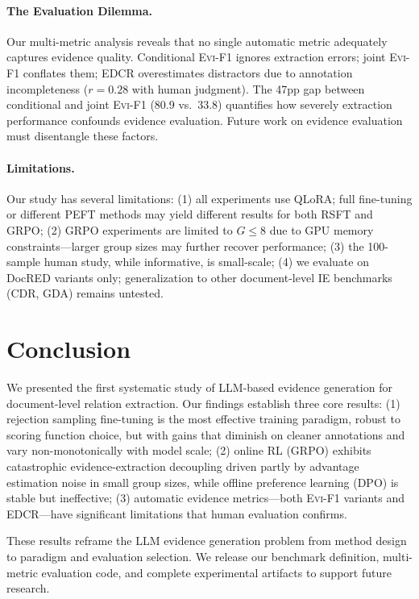 \documentclass[11pt,a4paper]{article}
\newcommand{\evi}{\textsc{Evi-F1}}
\newcommand{\edcr}{\textsc{EDCR}}
\begin{document}
\paragraph{The Evaluation Dilemma.}
Our multi-metric analysis reveals that no single automatic metric adequately captures evidence quality. Conditional \evi{} ignores extraction errors; joint \evi{} conflates them; \edcr{} overestimates distractors due to annotation incompleteness ($r{=}0.28$ with human judgment). The 47pp gap between conditional and joint \evi{} (80.9 vs.\ 33.8) quantifies how severely extraction performance confounds evidence evaluation. Future work on evidence evaluation must disentangle these factors.

\paragraph{Limitations.}
Our study has several limitations: (1) all experiments use QLoRA; full fine-tuning or different PEFT methods may yield different results for both RSFT and GRPO; (2) GRPO experiments are limited to $G \leq 8$ due to GPU memory constraints---larger group sizes may further recover performance; (3) the 100-sample human study, while informative, is small-scale; (4) we evaluate on DocRED variants only; generalization to other document-level IE benchmarks (CDR, GDA) remains untested.

\section{Conclusion}

We presented the first systematic study of LLM-based evidence generation for document-level relation extraction. Our findings establish three core results: (1) rejection sampling fine-tuning is the most effective training paradigm, robust to scoring function choice, but with gains that diminish on cleaner annotations and vary non-monotonically with model scale; (2) online RL (GRPO) exhibits catastrophic evidence-extraction decoupling driven partly by advantage estimation noise in small group sizes, while offline preference learning (DPO) is stable but ineffective; (3) automatic evidence metrics---both \evi{} variants and \edcr{}---have significant limitations that human evaluation confirms.

These results reframe the LLM evidence generation problem from method design to paradigm and evaluation selection. We release our benchmark definition, multi-metric evaluation code, and complete experimental artifacts to support future research.
\end{document}
